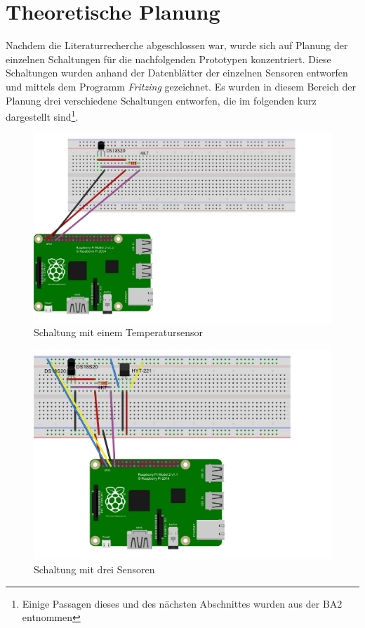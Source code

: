 \section{Theoretische Planung}
\label{Theoretische Planung}
Nachdem die Literaturrecherche abgeschlossen war, wurde sich auf Planung der einzelnen Schaltungen für die nachfolgenden Prototypen konzentriert. Diese Schaltungen wurden anhand der Datenblätter der einzelnen Sensoren entworfen und mittels dem Programm \textit{Fritzing} gezeichnet. Es wurden in diesem Bereich der Planung drei verschiedene Schaltungen entworfen, die im folgenden kurz dargestellt sind\footnote{Einige Passagen dieses und des nächsten Abschnittes wurden aus der BA2 entnommen}.\newpage

\begin{figure}[!h] 
  \centering
     \includegraphics[scale=.4]{BilderAllgemein/Schaltung_DS18S20.png}
  \caption{Schaltung mit einem Temperatursensor}
  
\end{figure}

\begin{figure}[!h] 
  \centering
     \includegraphics[scale=.4]{BilderAllgemein/Schaltung_HYT221.png}
  \caption{Schaltung mit drei Sensoren}

\end{figure}

